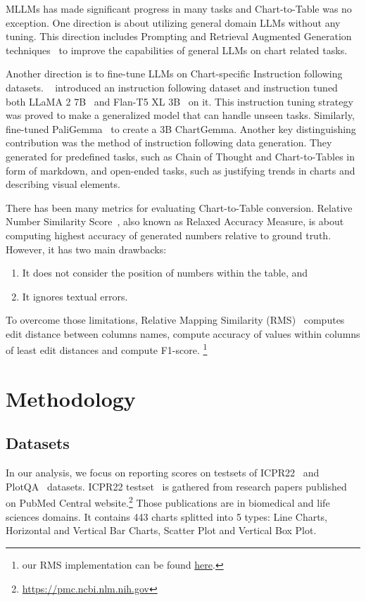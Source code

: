 \documentclass[
	letterpaper, %
]{jdf}
\begin{document}
MLLMs has made significant progress in many tasks and Chart-to-Table was no exception.
One direction is about utilizing general domain LLMs without any tuning.
This direction includes Prompting and Retrieval Augmented Generation techniques~\cite{cao2024graphinsight, voigt2023vist5} to improve the capabilities of general LLMs on chart related tasks.

Another direction is to fine-tune LLMs on Chart-specific Instruction following datasets.
~\cite{masry2024chartinstruct} introduced an instruction following dataset and instruction tuned both LLaMA 2 7B~\cite{touvron2023llama} and Flan-T5 XL 3B~\cite{chung2024scaling} on it.
This instruction tuning strategy was proved to make a generalized model that can handle unseen tasks.
Similarly,~\cite{masry2024chartgemma} fine-tuned PaliGemma~\cite{beyer2024paligemma} to create a 3B ChartGemma.
Another key distinguishing contribution was the method of instruction following data generation.
They generated for predefined tasks, such as Chain of Thought and Chart-to-Tables in form of markdown, and open-ended tasks, such as justifying trends in charts and describing visual elements.

There has been many metrics for evaluating Chart-to-Table conversion.
Relative Number Similarity Score~\cite{masry2022chartqa}, also known as Relaxed Accuracy Measure, is about  computing highest accuracy of generated numbers relative to ground truth.
However, it has two main drawbacks:
\begin{enumerate}
         \item It does not consider the position of numbers within the table, and
         \item It ignores textual errors.
              \end{enumerate}
To overcome those limitations, Relative Mapping Similarity (RMS)~\cite{liu2022deplot} computes edit distance between columns names, compute accuracy of values within columns of least edit distances and compute F1-score.
\footnote{our RMS implementation can be found \href{https://github.gatech.edu/mfayed8/GIE-metrics}{here}.}


\section{Methodology}\label{sect:methodology}
\subsection{Datasets}
In our analysis, we focus on reporting scores on testsets of ICPR22~\cite{rousseau2023pattern} and PlotQA~\cite{methani2020plotqa} datasets.
ICPR22 testset~\cite{rousseau2023pattern} is gathered from research papers published on PubMed Central website.\footnote{\href{https://pmc.ncbi.nlm.nih.gov}{https://pmc.ncbi.nlm.nih.gov}}
Those publications are in biomedical and life sciences domains.
It contains 443 charts splitted into 5 types: Line Charts, Horizontal and Vertical Bar Charts, Scatter Plot and Vertical Box Plot.
\end{document}
